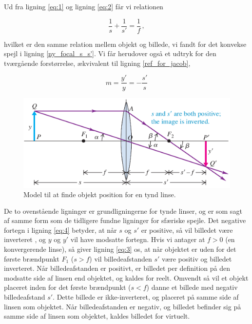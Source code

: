 \noindent Ud fra ligning \eqref{eq:1} og ligning \eqref{eq:2} får vi relationen

\begin{equation}
\frac{1}{s}+\frac{1}{s'} = \frac{1}{f} \, ,
\label{eq:3}
\end{equation}

\noindent hvilket er den samme relation mellem objekt og billede, vi fandt for det konvekse spejl i ligning \eqref{ny_focal_s_s'}. Vi får herudover også et udtryk for den tværgående forstørrelse, ækvivalent til ligning \eqref{ref_for_jacob},

\begin{equation}
m = \frac{y'}{y} = -\frac{s'}{s}
\label{eq:4}
\end{equation}

\begin{figure}[h!]
	\centering
	\includegraphics[scale=0.3]{Geometrisk-Optik/lens_objekt.PNG}
	\caption{Model til at finde objekt position for en tynd linse.}
	\label{bla}
\end{figure}

\noindent De to ovenstående ligninger er grundligningerne for tynde linser, og er som sagt af samme form som de tidligere fundne ligninger for sfæriske spejle. Det negative fortegn i ligning \eqref{eq:4} betyder, at når $s$ og $s'$ er positive, så vil billedet være inverteret , og $y$ og $y'$ vil have modsatte fortegn. Hvis vi antager at $f>0$ (en konvergerende linse), så giver ligning \eqref{eq:3} os, at når objektet er uden for det første brændpunkt $F_1$ ($s>f$) vil billedeafstanden $s'$ være positiv og billedet inverteret. Når billedeafstanden er positivt, er billedet per definition på den modsatte side af linsen end objektet, og kaldes for reelt. Omvendt så vil et objekt placeret inden for det første brændpunkt ($s<f$) danne et billede med negativ billedeafstand $s'$. Dette billede er ikke-inverteret, og placeret på samme side af linsen som objektet. Når billedeafstanden er negativ, og billedet befinder sig på samme side af linsen som objektet, kaldes billedet for virtuelt.

